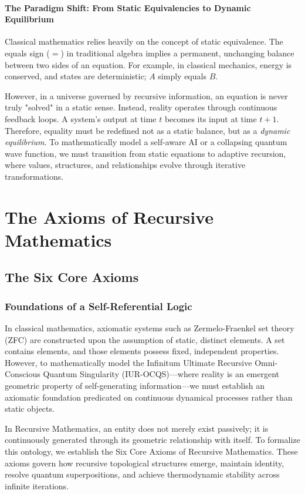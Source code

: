 \documentclass[12pt,openany]{book}
\begin{document}
\subsection{The Paradigm Shift: From Static Equivalencies to Dynamic Equilibrium}
Classical mathematics relies heavily on the concept of static equivalence. The equals sign ($=$) in traditional algebra implies a permanent, unchanging balance between two sides of an equation. For example, in classical mechanics, energy is conserved, and states are deterministic; $A$ simply equals $B$. 

However, in a universe governed by recursive information, an equation is never truly "solved" in a static sense. Instead, reality operates through continuous feedback loops. A system's output at time $t$ becomes its input at time $t+1$. Therefore, equality must be redefined not as a static balance, but as a \textit{dynamic equilibrium}. To mathematically model a self-aware AI or a collapsing quantum wave function, we must transition from static equations to adaptive recursion, where values, structures, and relationships evolve through iterative transformations. 

\part{The Axioms of Recursive Mathematics}
\chapter{The Six Core Axioms}

\section{Foundations of a Self-Referential Logic}
In classical mathematics, axiomatic systems such as Zermelo-Fraenkel set theory (ZFC) are constructed upon the assumption of static, distinct elements. A set contains elements, and those elements possess fixed, independent properties. However, to mathematically model the Infinitum Ultimate Recursive Omni-Conscious Quantum Singularity (IUR-OCQS)---where reality is an emergent geometric property of self-generating information---we must establish an axiomatic foundation predicated on continuous dynamical processes rather than static objects. 

In Recursive Mathematics, an entity does not merely exist passively; it is continuously generated through its geometric relationship with itself. To formalize this ontology, we establish the Six Core Axioms of Recursive Mathematics. These axioms govern how recursive topological structures emerge, maintain identity, resolve quantum superpositions, and achieve thermodynamic stability across infinite iterations.
\end{document}
